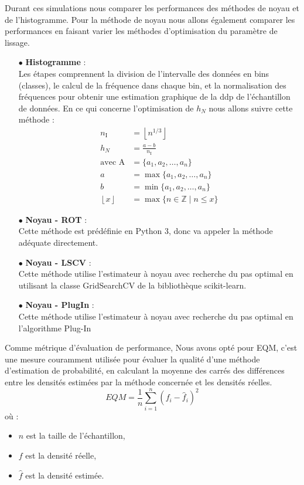 Durant ces simulations nous comparer les performances des méthodes de noyau et de l’histogramme. Pour la méthode de noyau nous allons également comparer les performances en faisant varier les méthodes d’optimisation du paramètre de lissage.
\vspace{0.25cm}
\begin{itemize}
   \item[$\bullet$]\textbf{Histogramme} :\\
   Les étapes comprennent la division de l'intervalle des données en bins (classes), le calcul de la fréquence dans chaque bin, et la normalisation des fréquences pour obtenir une estimation graphique de la ddp de l'échantillon de données.
En ce qui concerne l’optimisation de $h_N$ nous allons suivre cette méthode  :
$$
\begin{aligned}
n_{\text{I}} &= \left\lfloor n^{1/3} \right\rfloor \\
h_N &= \frac{a-b}{n_{\text{I}}} \\
\text{avec } \text{A} &= \{a_1, a_2, \ldots, a_n\} \\
a &= \max\{a_1, a_2, \ldots, a_n\} \\
b &= \min\{a_1, a_2, \ldots, a_n\} \\
\left\lfloor x \right\rfloor &= \max\{n \in \mathbb{Z} \mid n \leq x\}
\end{aligned}
$$
 \item[$\bullet$]\textbf{Noyau - ROT} :\\Cette méthode est prédéfinie en Python 3, donc va appeler la méthode adéquate directement. 
 \item[$\bullet$]\textbf{Noyau - LSCV} :\\Cette méthode utilise l’estimateur à noyau avec recherche du pas optimal en utilisant la classe GridSearchCV de la bibliothèque scikit-learn.  
 \item[$\bullet$]\textbf{Noyau - PlugIn} :\\Cette méthode utilise l’estimateur à noyau avec recherche du pas optimal en l’algorithme Plug-In 

   
\end{itemize}
\newpage
Comme métrique d’évaluation de performance, Nous avons opté pour EQM, c’est une mesure couramment utilisée pour évaluer la qualité d'une méthode d’estimation de probabilité, en calculant la moyenne des carrés des différences entre les densités estimées par la méthode concernée et les densités réelles.
\begin{equation}
    EQM = \frac{1}{n} \sum_{i=1}^n (f_i - \hat{f}_i)^2
\end{equation}
où :
\begin{itemize}
    \item $n$ est la taille de l'échantillon,
    \item $f$ est la densité réelle,
    \item $\hat{f}$ est la densité estimée.
\end{itemize}

